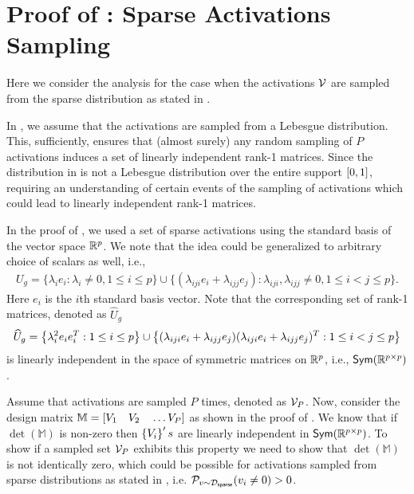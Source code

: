 \section{Proof of : Sparse Activations Sampling}\label{app: samplesparse}

    Here we consider the analysis for the case when the activations ${\mathcal{V}}$ are sampled from the sparse distribution as stated in .

    In , we assume that the activations are sampled from a Lebesgue distribution. This, sufficiently, ensures that (almost surely) any random sampling of $P$ activations induces a set of linearly independent rank-1 matrices. Since the distribution in  is not a Lebesgue distribution over the entire support $\left[0,1\right]$, requiring an understanding of certain events of the sampling of activations which could lead to linearly independent rank-1 matrices.

    In the proof of , we used a set of sparse activations using the standard basis of the vector space $\mathbb{R}^p$. We note that the idea could be generalized to arbitrary choice of scalars as well, i.e.,
    \begin{align*}
         U_g = \{\lambda_i e_i: \lambda_i \neq 0, 1 \leq i \leq p\} \cup \{(\lambda_{iji} e_i + \lambda_{ijj}e_j): \lambda_{iji},\lambda_{ijj} \neq 0,  1 \leq i < j \leq p \}.
    \end{align*}
    Here $e_i$ is the $i$th standard basis vector. Note that the corresponding set of rank-1 matrices, denoted as $\widehat{U}_g$ 
    \begin{align*}
        \widehat{U}_g = \left\{\lambda_i^2 e_ie_i^T: 1 \leq i \leq p\right\} \cup \left\{(\lambda_{iji} e_i + \lambda_{ijj}e_j)(\lambda_{iji} e_i + \lambda_{ijj}e_j)^T: 1 \leq i < j \leq p\right\}
    \end{align*}
    is linearly independent in the space of symmetric matrices on $\mathbb{R}^p$, i.e., $\textsf{Sym}(\mathbb{R}^{p\times p})$.

    Assume that activations are sampled $P$ times, denoted as ${\mathcal{V}}_P$. Now, consider the design matrix $\mathbb{M} = \left[ V_1 \quad V_2 \quad \ldots V_P\right]$ as shown in the proof of . We know that if $\det(\mathbb{M})$ is non-zero then $\left\{V_i\right\}'s$ are linearly independent in $\textsf{Sym}(\mathbb{R}^{p\times p})$. To show if a sampled set ${\mathcal{V}}_P$ exhibits this property we need to show that $\det(\mathbb{M})$ is not identically zero, which could be possible for activations sampled from sparse distributions as stated in , i.e. ${\mathcal{P}}_{v \sim {\mathcal{D}}_{\textsf{sparse}}}( v_i \neq 0) > 0$.

